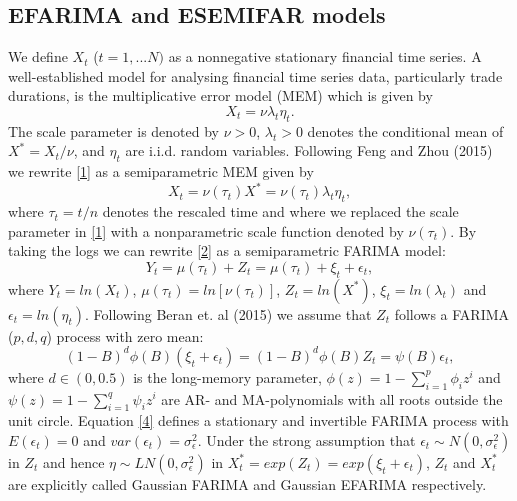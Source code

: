 \documentclass[12pt]{article}
\begin{document}
\subsection{EFARIMA  and ESEMIFAR models}
We define $X_t$ ($t=1,...N)$ as a nonnegative stationary financial time series. A well-established model for  analysing financial time series data, particularly trade durations,                                                                                                                                                                                                                                                                                                                                                                                                                                                                                                                                                                                                                                                                                                                                                                                          is the multiplicative error model (MEM) which is given by 
\begin{equation}
\label{1}
X_t=\nu \lambda_t \eta_t.
\end{equation}
The scale parameter is denoted by $\nu >0$, $\lambda_t >0$ denotes the conditional mean of $X^*=X_t/\nu$, and $\eta_t$ are i.i.d. random variables. Following Feng and Zhou (2015) we rewrite \eqref{1} as a semiparametric MEM given by
\begin{equation}
\label{2}
X_t=\nu(\tau_t)X^*=\nu(\tau_t)\lambda_t \eta_t,
\end{equation}   
where $\tau_t=t/n$ denotes the rescaled time and where we replaced the scale parameter in \eqref{1} with a nonparametric scale function denoted by $\nu(\tau_t)$. 
By taking the logs we can rewrite \eqref{2} as a semiparametric FARIMA model:
\begin{equation}
Y_t=\mu(\tau_t) + Z_t=\mu(\tau_t)+\xi_t + \epsilon_t,
\end{equation}
where $Y_t=ln(X_t)$, $\mu(\tau_t)=ln[\nu(\tau_t)]$, $Z_t=ln(X^*)$, $\xi_t=ln(\lambda_t)$ and $\epsilon_t=ln(\eta_t)$. Following Beran et. al (2015) we assume that $Z_t$ follows a FARIMA ($p, d, q$) process with zero mean:
\begin{equation}
\label{4}
(1-B)^d\phi(B)(\xi_t + \epsilon_t)=(1-B)^d\phi(B)Z_t =\psi(B)\epsilon_t,
\end{equation}
where $d \in (0,0.5)$ is the long-memory parameter, $\phi(z)=1-\sum_{i=1}^{p}\phi_iz^i$ and  $\psi(z)=1-\sum_{i=1}^{q}\psi_iz^i$ are AR- and MA-polynomials with all roots outside the unit circle. Equation \eqref{4} defines a stationary and invertible FARIMA process with $E(\epsilon_t)=0$ and $var(\epsilon_t)=\sigma^2_{\epsilon}$. Under the strong assumption that $\epsilon_t \sim  N(0,\sigma^2_{\epsilon})$ in $Z_t$ and hence $\eta  \sim   LN(0,\sigma^2_{\epsilon})$ in $X^*_t=exp(Z_t)=exp(\xi_t + \epsilon_t)$, $Z_t$ and $X^*_t$ are explicitly called Gaussian FARIMA and Gaussian EFARIMA respectively.
\end{document}
